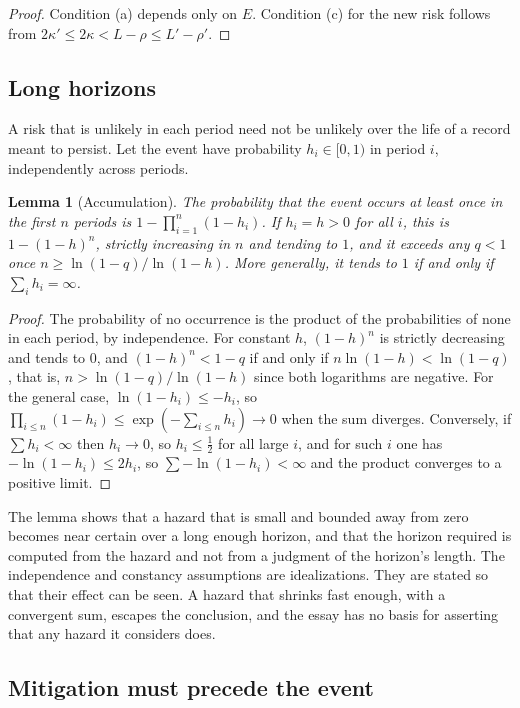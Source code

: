\documentclass[11pt]{article}
\theoremstyle{plain}
\newtheorem{lemma}[theorem]{Lemma}
\theoremstyle{definition}
\theoremstyle{remark}
\begin{document}
\begin{proof}
Condition (a) depends only on $E$. Condition (c) for the new risk follows from $2\kappa'\le2\kappa<L-\rho\le L'-\rho'$. \qedhere
\end{proof}

\subsection{Long horizons}

A risk that is unlikely in each period need not be unlikely over the life of a record meant to persist. Let the event have probability $h_i\in[0,1)$ in period $i$, independently across periods.

\begin{lemma}[Accumulation]\label{lem:accum}
The probability that the event occurs at least once in the first $n$ periods is $1-\prod_{i=1}^{n}(1-h_i)$. If $h_i=h>0$ for all $i$, this is $1-(1-h)^n$, strictly increasing in $n$ and tending to $1$, and it exceeds any $q<1$ once $n\ge\ln(1-q)/\ln(1-h)$. More generally, it tends to $1$ if and only if $\sum_i h_i=\infty$.
\end{lemma}

\begin{proof}
The probability of no occurrence is the product of the probabilities of none in each period, by independence. For constant $h$, $(1-h)^n$ is strictly decreasing and tends to $0$, and $(1-h)^n<1-q$ if and only if $n\ln(1-h)<\ln(1-q)$, that is, $n>\ln(1-q)/\ln(1-h)$ since both logarithms are negative. For the general case, $\ln(1-h_i)\le-h_i$, so $\prod_{i\le n}(1-h_i)\le\exp(-\sum_{i\le n}h_i)\to0$ when the sum diverges. Conversely, if $\sum h_i<\infty$ then $h_i\to0$, so $h_i\le\tfrac12$ for all large $i$, and for such $i$ one has $-\ln(1-h_i)\le2h_i$, so $\sum-\ln(1-h_i)<\infty$ and the product converges to a positive limit. \qedhere
\end{proof}

The lemma shows that a hazard that is small and bounded away from zero becomes near certain over a long enough horizon, and that the horizon required is computed from the hazard and not from a judgment of the horizon's length. The independence and constancy assumptions are idealizations. They are stated so that their effect can be seen. A hazard that shrinks fast enough, with a convergent sum, escapes the conclusion, and the essay has no basis for asserting that any hazard it considers does.

\subsection{Mitigation must precede the event}
\end{document}
